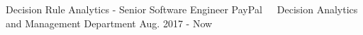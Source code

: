 \documentclass[11pt, a4paper, UTF8]{awesome-cv}
\begin{document}
%
\begin{cventries}
  \cventry
    {Decision Rule Analytics - Senior Software Engineer} %
    {PayPal{\ \cdotp\ \ }Decision Analytics and Management Department} %
    {Aug. 2017 - Now} %
    {\ } %
    {
      \begin{cvitems} %

\end{cvitems}}
\end{cventries}
\end{document}
